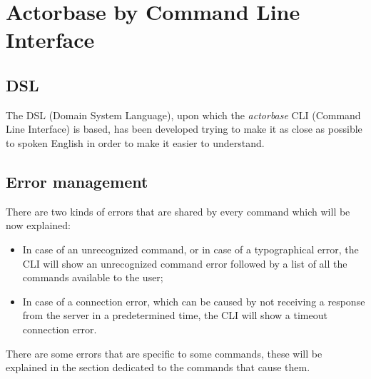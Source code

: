 \documentclass{scalatekids-article}
\begin{document}






\section{Actorbase by Command Line Interface}

\subsection{DSL} %

The DSL (Domain System Language), upon which the \textit{actorbase} CLI (Command
Line Interface) is based, has been developed trying to make it as close as possible
to spoken English in order to make it easier to understand.

\subsection{Error management}

There are two kinds of errors that are shared by every command which will be
now explained:
\begin{itemize}
\item In case of an unrecognized command, or in case of a typographical error,
  the CLI will show an unrecognized command error followed by a list of all
  the commands available to the user;
\item In case of a connection error, which can be caused by not receiving a
  response from the server in a predetermined time, the CLI will show a
  timeout connection error.
\end{itemize}
There are some errors that are specific to some commands, these will be explained
in the section dedicated to the commands that cause them.
\end{document}
